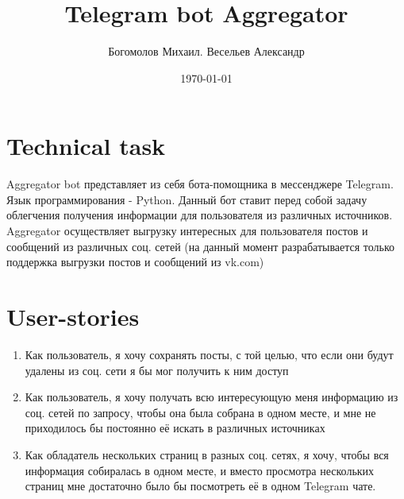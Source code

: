 \documentclass[a4paper,12pt]{article} %
\author{Богомолов Михаил. Весельев Александр}
\title{Telegram bot Aggregator }
\date{\today}
\begin{document}
	\maketitle
	\section*{Technical task}
		Aggregator bot представляет
		из себя бота-помощника в мессенджере Telegram. Язык программирования - 
		Python.
		Данный бот ставит перед собой задачу облегчения получения информации для
		пользователя из различных источников.
		Aggregator осуществляет выгрузку интересных для пользователя постов и
		сообщений из
		различных соц. сетей (на данный момент разрабатывается только поддержка 
		выгрузки постов и сообщений из vk.com)
	\section*{User-stories}
		\begin{enumerate}
			\item Как пользователь, я хочу сохранять посты, с той целью,
			что если они будут удалены из соц. сети я бы мог получить к ним доступ  
			\item Как пользователь, я хочу получать всю интересующую меня информацию
			из соц. сетей по запросу, чтобы она была собрана в одном месте, и мне не приходилось
			бы постоянно её искать в различных источниках
			\item Как обладатель нескольких страниц в разных соц. сетях, я хочу,
			чтобы вся информация собиралась в одном месте, и вместо просмотра 
			нескольких страниц мне достаточно было бы посмотреть её в одном Telegram
			чате.
		\end{enumerate}
\end{document}
